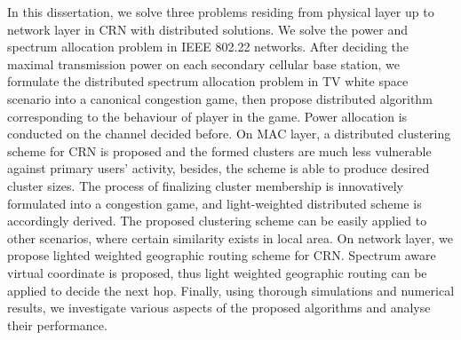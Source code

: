 In this dissertation, we solve three problems residing from physical layer up to network layer in CRN with distributed solutions.
%
We solve the power and spectrum allocation problem in IEEE 802.22 networks.
After deciding the maximal transmission power on each secondary cellular base station, we formulate the distributed spectrum allocation problem in TV white space scenario into a canonical congestion game, then propose distributed algorithm corresponding to the behaviour of player in the game.
Power allocation is conducted on the channel decided before.
%
On MAC layer, %
a distributed clustering scheme for CRN is proposed and the formed clusters are much less vulnerable against primary users' activity, besides, the scheme is able to produce desired cluster sizes.
The process of finalizing cluster membership is innovatively formulated into a congestion game, and light-weighted distributed scheme is accordingly derived.
The proposed clustering scheme can be easily applied to other scenarios, where certain similarity exists in local area.
%
On network layer, we propose lighted weighted geographic routing scheme for CRN. 
Spectrum aware virtual coordinate is proposed, thus light weighted geographic routing can be applied to decide the next hop.
%
Finally, using thorough simulations and numerical results, we investigate various aspects of the proposed algorithms and analyse their performance.